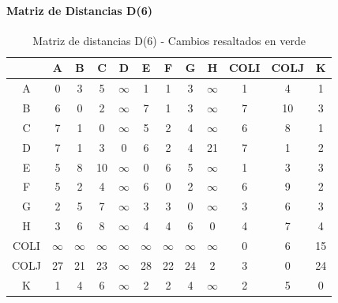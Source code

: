 \documentclass[12pt]{article}
\begin{document}
\paragraph{Matriz de Distancias D(6)}
\begin{table}[h!]
\centering
\begin{tabular}{|c|c|c|c|c|c|c|c|c|c|c|c|}
\hline
 & A & B & C & D & E & F & G & H & COLI & COLJ & K \\\hline
A & 0 & \cellcolor{lightgreen} 3 & \cellcolor{lightgreen} 5 & $\infty$ & 1 & 1 & \cellcolor{lightgreen} 3 & $\infty$ & 1 & 4 & 1 \\\hline
B & \cellcolor{lightgreen} 6 & 0 & 2 & $\infty$ & 7 & 1 & \cellcolor{lightgreen} 3 & $\infty$ & \cellcolor{lightgreen} 7 & 10 & 3 \\\hline
C & \cellcolor{lightgreen} 7 & 1 & 0 & $\infty$ & 5 & 2 & \cellcolor{lightgreen} 4 & $\infty$ & 6 & 8 & 1 \\\hline
D & \cellcolor{lightgreen} 7 & 1 & 3 & 0 & 6 & 2 & \cellcolor{lightgreen} 4 & 21 & 7 & 1 & 2 \\\hline
E & 5 & \cellcolor{lightgreen} 8 & \cellcolor{lightgreen} 10 & $\infty$ & 0 & 6 & 5 & $\infty$ & 1 & 3 & 3 \\\hline
F & 5 & 2 & 4 & $\infty$ & 6 & 0 & 2 & $\infty$ & 6 & 9 & 2 \\\hline
G & 2 & \cellcolor{lightgreen} 5 & \cellcolor{lightgreen} 7 & $\infty$ & 3 & 3 & 0 & $\infty$ & 3 & 6 & 3 \\\hline
H & 3 & \cellcolor{lightgreen} 6 & 8 & $\infty$ & 4 & 4 & \cellcolor{lightgreen} 6 & 0 & 4 & 7 & 4 \\\hline
COLI & $\infty$ & $\infty$ & $\infty$ & $\infty$ & $\infty$ & $\infty$ & $\infty$ & $\infty$ & 0 & 6 & 15 \\\hline
COLJ & \cellcolor{lightgreen} 27 & 21 & 23 & $\infty$ & 28 & 22 & \cellcolor{lightgreen} 24 & 2 & 3 & 0 & 24 \\\hline
K & 1 & \cellcolor{lightgreen} 4 & \cellcolor{lightgreen} 6 & $\infty$ & 2 & 2 & \cellcolor{lightgreen} 4 & $\infty$ & 2 & 5 & 0 \\\hline
\end{tabular}
\caption{Matriz de distancias D(6) - Cambios resaltados en verde}
\end{table}
\end{document}
